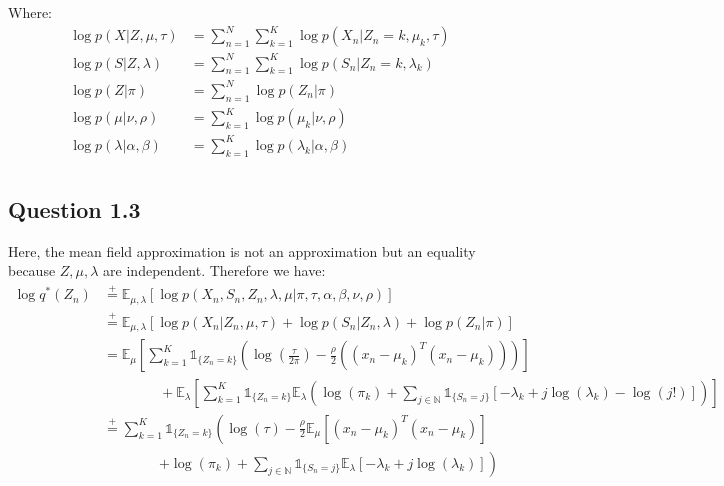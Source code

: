 \documentclass{article}
\begin{document}
Where:
\begin{equation}
  \begin{split}
    \log p(X|Z,\mu,\tau)         & = \sum_{n=1}^{N}\sum_{k=1}^{K}\log p(X_n|Z_n = k, \mu_k, \tau) \\
    \log p(S|Z,\lambda)          & = \sum_{n=1}^{N}\sum_{k=1}^{K}\log p(S_n|Z_n = k, \lambda_k)   \\
    \log p(Z|\pi)                & = \sum_{n=1}^{N}\log p(Z_n|\pi)                                \\
    \log p(\mu|\nu,\rho)         & = \sum_{k=1}^{K}\log p(\mu_k|\nu,\rho)                         \\
    \log p(\lambda|\alpha,\beta) & = \sum_{k=1}^{K}\log p(\lambda_k|\alpha,\beta)                 \\
  \end{split}
\end{equation}

\subsection{Question 1.3}

Here, the mean field approximation is not an approximation but an equality because $Z, \mu, \lambda$ are independent. Therefore we have:
\begin{equation}
  \begin{split}
    \log q^*(Z_n) & \overset{+}{=} \mathbb{E}_{\mu,\lambda}[\log p(X_n,S_n,Z_n,\lambda,\mu|\pi,\tau,\alpha,\beta,\nu,\rho)]                                                                                                                                   \\
                  & \overset{+}{=} \mathbb{E}_{\mu,\lambda}[\log p(X_n|Z_n,\mu,\tau) + \log p(S_n|Z_n,\lambda) + \log p(Z_n|\pi)]                                                                                                                             \\
                  & = \mathbb{E}_{\mu}\left[\sum_{k=1}^{K}\mathbb{1}_{\{Z_n = k\}}\left(\log \left(\frac{\tau}{2\pi}\right) -\frac{\rho}{2}\left((x_n - \mu_k)^T(x_n - \mu_k)\right)\right)\right]                                                            \\
                  & \qquad\qquad + \mathbb{E}_{\lambda}\left[\sum_{k=1}^{K}\mathbb{1}_{\{Z_n = k\}}\mathbb{E}_{\lambda}\left(\log(\pi_k) + \sum_{j \in \mathbb{N}}\mathbb{1}_{\{S_n = j\}}\left[-\lambda_k + j\log(\lambda_k) - \log(j!)\right]\right)\right] \\
                  & \overset{+}{=} \sum_{k=1}^{K}\mathbb{1}_{\{Z_n = k\}}\left(\log(\tau) - \frac{\rho}{2}\mathbb{E}_{\mu}\left[(x_n - \mu_k)^T(x_n - \mu_k)\right] \right.                                                                                   \\
                  & \qquad\qquad \left. + \log(\pi_k) + \sum_{j \in \mathbb{N}}\mathbb{1}_{\{S_n = j\}}\mathbb{E}_{\lambda}\left[-\lambda_k + j\log(\lambda_k)\right]\right)
  \end{split}
\end{equation}
\end{document}
